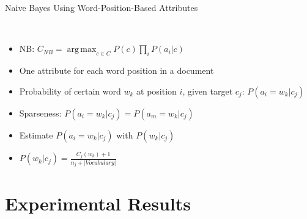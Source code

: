 \documentclass[]{beamer}
\DeclareMathOperator*{\argmax}{arg\,max}
\begin{document}
\begin{frame}[t]{\centerline{Naive Bayes Using Word-Position-Based Attributes}}
\ \\
  \fontsize{14}{12}\selectfont
  \begin{itemize}
  \item NB: $C_{NB}=\argmax_{c \in C} P(c) \prod_{i} P(a_i | c)$
\pause
  \item One attribute for each word position in a document
\pause
  \item Probability of certain word $w_k$ at position $i$, given target $c_j$: $P(a_i = w_k | c_j)$
\pause
  \item Sparseness: $P(a_i = w_k | c_j) = P(a_m = w_k | c_j)$
\pause
  \item Estimate $P(a_i = w_k | c_j)$ with $P(w_k | c_j)$
\pause
  \item $P(w_k | c_j) = \frac{C_j(w_k)+1}{n_j+|Vocabulary|}$
  \end{itemize}
\end{frame}
\note{}

\section{Experimental Results}
\end{document}
